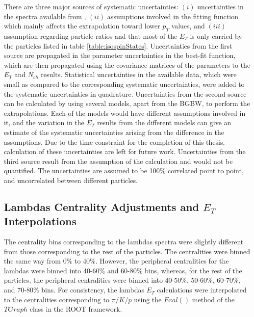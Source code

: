 There are three major sources of systematic uncertainties: $(i)$ uncertainties in the spectra available from \cite{PhysRevC.96.044904}, $(ii)$ assumptions involved in the fitting function which mainly affects the extrapolation toward lower $p_{T}$ values, and $(iii)$ assumption regarding particle ratios and that most of the $E_{T}$ is only carried by the particles listed in table \ref{table:isospinStates}. Uncertainties from the first source are propagated in the parameter uncertainties in the best-fit function, which are then propagated using the covariance matrices of the parameters to the $E_{T}$ and $N_{ch}$ results. Statistical uncertainties in the available data, which were small as compared to the corresponding systematic uncertainties, were added to the systematic uncertainties in quadrature. Uncertainties from the second source can be calculated by using several models, apart from the BGBW, to perform the extrapolations. Each of the models would have different assumptions involved in it, and the variation in the $E_{T}$ results from the different models can give an estimate of the systematic uncertainties arising from the difference in the assumptions. Due to the time constraint for the completion of this thesis, calculation of these uncertainties are left for future work. Uncertainties from the third source result from the assumption of the calculation and would not be quantified. The uncertainties are assumed to be 100\% correlated point to point, and uncorrelated between different particles.
 
\subsection{Lambdas Centrality Adjustments and $E_{T}$ Interpolations}
The centrality bins corresponding to the lambdas spectra were slightly different from those corresponding to the rest of the particles. The centralities were binned the same way from 0\% to 40\%. However, the peripheral centralities for the lambdas were binned into 40-60\% and 60-80\% bins, whereas, for the rest of the particles, the peripheral centralities were binned into 40-50\%, 50-60\%, 60-70\%, and 70-80\% bins. For consistency, the lambdas $E_{T}$ calculations were interpolated to the centralities corresponding to $\pi/K/p$ using the $Eval()$ method of the $TGraph$ class in the ROOT framework.
